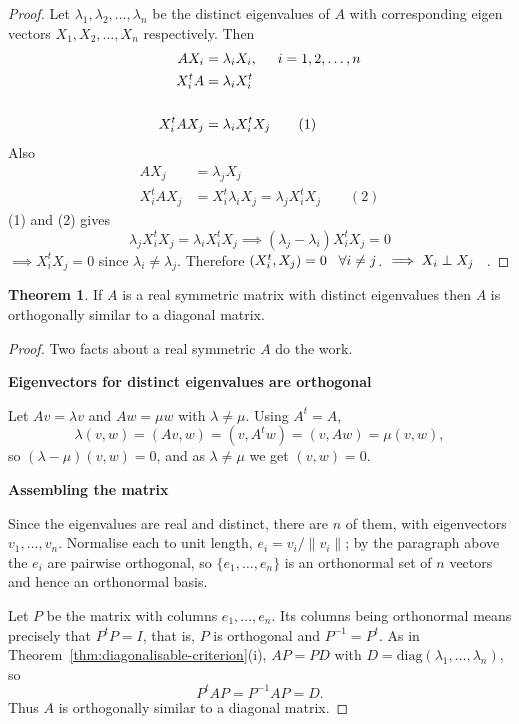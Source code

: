 \documentclass[11pt,a4paper]{article}
\theoremstyle{definition}
\newtheorem{thm}{Theorem}[subsection]
\newcommand{\subhead}[1]{%
  \par\medskip\noindent\textbf{#1}\par\nobreak\smallskip}
\begin{document}
\begin{proof}
Let $\lambda_1,\lambda_2,\dots,\lambda_n$ be the distinct eigenvalues of $A$ with corresponding eigen vectors $X_1,X_2,\dots,X_n$ respectively. Then
\begin{align*}
AX_i &=\lambda_iX_i,\hspace{0.5cm} i=1,2,\dots,n\\
X_i^tA &=\lambda_iX_i^t\\\\
X^t_iAX_j &=\lambda_iX^t_iX_j\qquad (1)
\end{align*}
Also
\begin{align*}
AX_j &=\lambda_j X_j\\
X^t_iAX_j &=X^t_i\lambda_iX_j=\lambda_jX_i^tX_j\qquad (2)
\end{align*}
(1) and (2) gives$$\lambda_jX_i^tX_j=\lambda_iX^t_iX_j\implies (\lambda_j-\lambda_i)X^t_iX_j=0$$
$\implies X^t_iX_j=0$ since $\lambda_i\neq \lambda_j$. Therefore $(X^t_i,X_j)=0\hspace{0.3cm} \forall i\neq j$. $\implies \hspace{0.3cm X_i\perp X_j}$.
\end{proof}


\begin{thm}
If $A$ is a real symmetric matrix with distinct eigenvalues then $A$ is
orthogonally similar to a diagonal matrix.
\end{thm}

\begin{proof}
Two facts about a real symmetric $A$ do the work.

\subhead{Eigenvectors for distinct eigenvalues are orthogonal}
Let $Av=\lambda v$ and $Aw=\mu w$ with $\lambda\neq\mu$. Using $A^t=A$,
$$\lambda (v,w)=(Av,w)=(v,A^tw)=(v,Aw)=\mu (v,w),$$
so $(\lambda-\mu)(v,w)=0$, and as $\lambda\neq\mu$ we get $(v,w)=0$.

\subhead{Assembling the matrix}
Since the eigenvalues are real and distinct, there are $n$ of them, with
eigenvectors $v_1,\dots,v_n$. Normalise each to unit length, $e_i=v_i/\|v_i\|$;
by the paragraph above the $e_i$ are pairwise orthogonal, so
$\{e_1,\dots,e_n\}$ is an orthonormal set of $n$ vectors and hence an
orthonormal basis.

Let $P$ be the matrix with columns $e_1,\dots,e_n$. Its columns being
orthonormal means precisely that $P^tP=I$, that is, $P$ is orthogonal and
$P^{-1}=P^t$. As in Theorem~\ref{thm:diagonalisable-criterion}(i), $AP=PD$ with
$D=\text{diag}(\lambda_1,\dots,\lambda_n)$, so
$$P^tAP=P^{-1}AP=D.$$
Thus $A$ is orthogonally similar to a diagonal matrix.
\end{proof}
\end{document}
